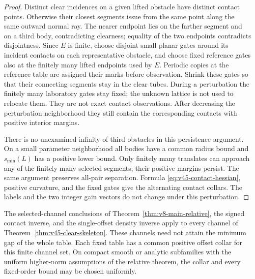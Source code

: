 \begin{proof}
Distinct clear incidences on a given lifted obstacle have distinct contact
points.  Otherwise their closest segments issue from the same point along
the same outward normal ray.  The nearer endpoint lies on the farther
segment and on a third body, contradicting clearness; equality of the two
endpoints contradicts disjointness.  Since $E$ is finite, choose disjoint
small planar gates around its incident contacts on each representative
obstacle, and choose fixed reference gates also at the finitely many lifted endpoints
used by $E$.  Periodic copies at the reference table are assigned their
marks before observation.  Shrink these gates so that their connecting
segments stay in the clear tubes.  During a perturbation the finitely many
laboratory gates stay fixed; the unknown lattice is not used to relocate
them.  They are not exact contact observations.
After decreasing the perturbation neighborhood they still contain the
corresponding contacts with positive interior margins.

There is no unexamined infinity of third obstacles in this persistence
argument.  On a small parameter neighborhood all bodies have a common
radius bound and $s_{\min}(L)$ has a positive lower bound.  Only finitely
many translates can approach any of the finitely many selected segments;
their positive margins persist.  The same argument preserves all-pair
separation.  Formula \eqref{eq:v45-contact-hessian}, positive curvature,
and the fixed gates give the alternating contact collars.  The labels and
the two integer gain vectors do not change under this perturbation.
\end{proof}

\begin{lemma}
\label{lem:v45-selected-locality}
The selected-channel conclusions of
Theorem~\ref{thm:v8-main-relative}, the signed contact inverse, and the
single-offset density inverse apply to every channel of
Theorem~\ref{thm:v45-clear-skeleton}.  These channels need not attain the
minimum gap of the whole table.  Each fixed table has a common positive
offset collar for this finite channel set.  On compact smooth or analytic
subfamilies with the uniform higher-norm assumptions of the relative
theorem, the collar and every fixed-order bound may be chosen uniformly.
\end{lemma}

